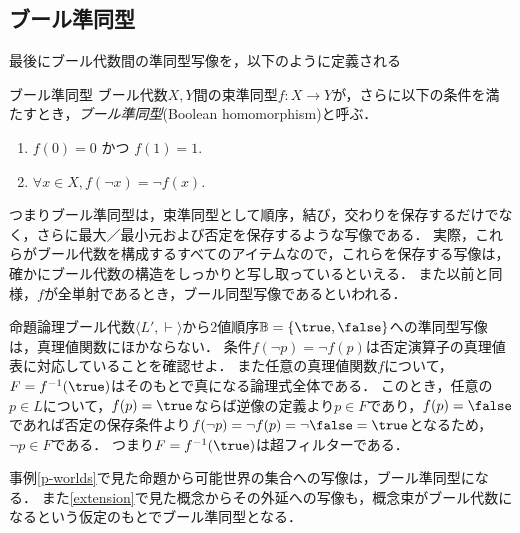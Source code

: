 \documentclass[11pt,a4paper]{jsarticle}
\begin{document}
\subsection{ブール準同型}

最後にブール代数間の準同型写像を，以下のように定義される

\begin{itembox}[l]{ブール準同型}
    ブール代数$X, Y$間の束準同型$f:X \to Y$が，さらに以下の条件を満たすとき，\emph{ブール準同型}(Boolean homomorphism)と呼ぶ．
    \begin{enumerate}
        \item $f(0) = 0$ かつ $f(1) = 1$.
        \item $\forall x \in X, f(\neg x) = \neg f(x) $.
    \end{enumerate}
\end{itembox}

つまりブール準同型は，束準同型として順序，結び，交わりを保存するだけでなく，さらに最大／最小元および否定を保存するような写像である．
実際，これらがブール代数を構成するすべてのアイテムなので，これらを保存する写像は，確かにブール代数の構造をしっかりと写し取っているといえる．
また以前と同様，$f$が全単射であるとき，ブール同型写像であるといわれる．

\begin{example}
命題論理ブール代数$\langle L', \vdash \rangle$から2値順序$\bbB = \{ \true, \false \}$への準同型写像は，真理値関数にほかならない．
条件$f( \neg p) = \neg f(p)$は否定演算子の真理値表に対応していることを確認せよ．
また任意の真理値関数$f$について，$F = f^{-1}(\true)$はそのもとで真になる論理式全体である．
このとき，任意の$p \in L$について，$f(p)=\true$ならば逆像の定義より$p \in F$であり，$f(p)=\false$であれば否定の保存条件より$f(\neg p) = \neg f(p) = \neg \false = \true$となるため，$\neg p \in F$である．
つまり$F = f^{-1}(\true)$は超フィルターである．
\end{example}

\begin{example}
    事例\ref{p-worlds}で見た命題から可能世界の集合への写像は，ブール準同型になる．
    また\ref{extension}で見た概念からその外延への写像も，概念束がブール代数になるという仮定のもとでブール準同型となる．
\end{example}

\end{document}
